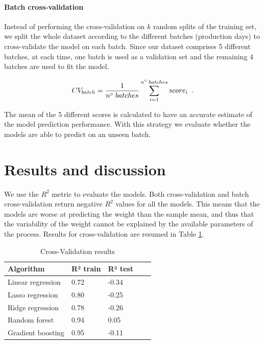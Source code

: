 \paragraph{Batch cross-validation}

Instead of performing the cross-validation on $k$ random splits of the training set, we split the whole dataset according to the different batches (production days) to cross-validate the model on each batch. Since our dataset comprises 5 different batches, at each time, one batch is used as a validation set and the remaining 4 batches are used to fit the model.

\begin{equation}
    CV_{batch} = \frac{1}{n\degree\;batches}\sum_{i=1}^{n\degree\;batches}score_{i}
    \enspace.
\end{equation}

The mean of the 5 different scores is calculated to have an accurate estimate of the model prediction performance. With this strategy we evaluate whether the models are able to predict on an unseen batch.  


\section{Results and discussion} \label{Results and Discussions}

We use the $R^2$ metric to evaluate the models. Both cross-validation and batch cross-validation return negative $R^2$ values for all the models. 
This means that the models are worse at predicting the weight than the sample mean, and thus that the variability of the weight cannot be explained by the available parameters of the process. Results for cross-validation are resumed in Table \ref{tab:cross_validation_results}.  

\begin{table}[]
\centering
\caption{Cross-Validation results}
\label{tab:cross_validation_results}
\begin{tabular}{lllll}
\toprule
\textbf{Algorithm} & \textbf{R² train} & \textbf{R² test} \\
\midrule
Linear regression   & 0.72   & -0.34    \\ 
Lasso regression    & 0.80   & -0.25    \\ 
Ridge regression    & 0.78   & -0.26    \\ 
Random forest       & 0.94   & 0.05     \\ 
Gradient boosting   & 0.95   & -0.11    \\ 
\bottomrule
\end{tabular}
\end{table}


